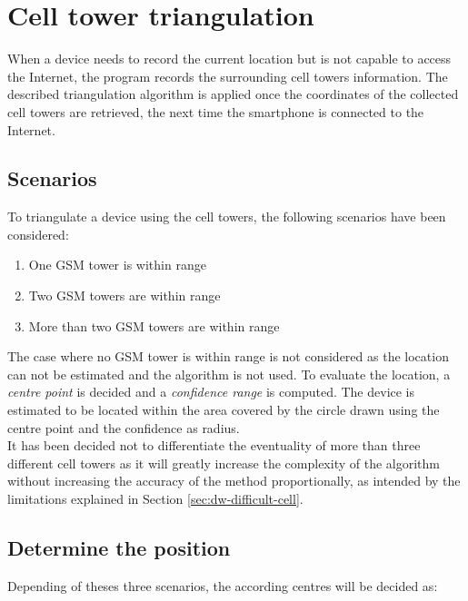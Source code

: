 \section{Cell tower triangulation}

\label{sec:dw-cell-triangu}



When a device needs to record the current location but is not capable to access the Internet, the program records the surrounding cell towers information.
The described triangulation algorithm is applied once the coordinates of the collected cell towers are retrieved, the next time the smartphone is connected to the Internet.

\subsection{Scenarios}

To triangulate a device using the cell towers, the following scenarios have been considered:

\begin{enumerate}
\item One GSM tower is within range
\item Two GSM towers are within range
\item More than two GSM towers are within range
\end{enumerate}

The case where no GSM tower is within range is not considered as the location can not be estimated and the algorithm is not used.
To evaluate the location, a \emph{centre point} is decided and a \emph{confidence range} is computed.
The device is estimated to be located within the area covered by the circle drawn using the centre point and the confidence as radius.\\

It has been decided not to differentiate the eventuality of more than three different cell towers as it will greatly increase the complexity of the algorithm without increasing the accuracy of the method proportionally, as intended by the limitations explained in Section \ref{sec:dw-difficult-cell}.

\subsection{Determine the position}

Depending of theses three scenarios, the according centres will be decided as:

